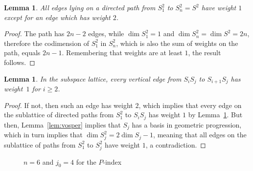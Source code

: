 \documentclass{article}
\theoremstyle{plain}
\newtheorem{lemma}[thm]{Lemma}
\theoremstyle{definition}
\theoremstyle{remark}
\renewcommand{\geq}{\geqslant}
\begin{document}
\begin{lemma}\label{lem:weight2}
  All edges lying on a directed path from $S_1^2$ to $S_n^2 = S^2$
  have weight $1$ except for an edge which has weight $2$.
\end{lemma}

\begin{proof}
  The path has $2n-2$ edges, while $\dim S_1^2 = 1$ and $\dim S_n^2
  =\dim S^2 = 2n$, therefore the codimension of $S_1^2$ in $S_n^2$,
  which is also the sum of weights on the path, equals
  $2n-1$. Remembering that weights are at least $1$, the result follows.
\end{proof}



\begin{lemma}\label{lem:vertical}
  In the subspace lattice, every vertical edge from $S_iS_j$ to
  $S_{i+1}S_j$ has weight~$1$ for $i\geq 2$. 
\end{lemma}

\begin{proof}
  If not, then such an edge has weight $2$, which implies that every
  edge on the sublattice of directed paths from $S_1^2$ to $S_iS_j$ has
  weight $1$ by Lemma~\ref{lem:weight2}. But then,
  Lemma~\ref{lem:vosper} implies that $S_j$ has a basis in geometric
  progression, which in turn implies that $\dim S_j^2=2\dim S_j-1$,
  meaning that all edges on the sublattice of paths from $S_1^2$ to
  $S_j^2$ have weight $1$, a contradiction.
\end{proof}

\begin{figure}[h]
    \centering
    \caption{$n=6$ and $j_0=4$ for the $P$-index}
    \label{fig:Pindex}
  \end{figure}
\end{document}
